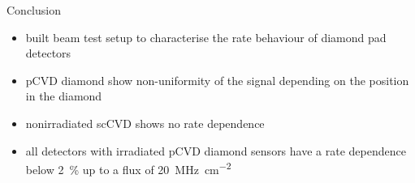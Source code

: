 \begin{frame}{Conclusion}

	\begin{minipage}[c][.5\textheight]{\textwidth}
		\begin{itemize}
			\itemfill
			\item built beam test setup to characterise the rate behaviour of diamond pad detectors
			\item pCVD diamond show non-uniformity of the signal depending on the position in the diamond
			\item nonirradiated scCVD shows no rate dependence
			\item all detectors with irradiated pCVD diamond sensors have a rate dependence below \SI{2}{\%} up to a flux of \SI{20}{\mega\hertz\per \centi\meter^2}
		\end{itemize}
	\end{minipage}
	
\end{frame}
